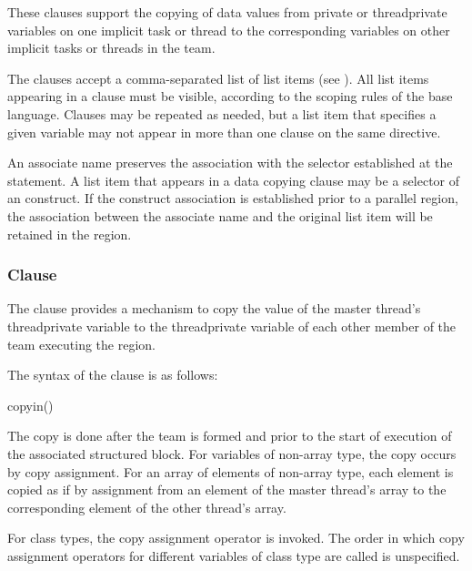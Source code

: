 {{{{These clauses support the copying of data values from private or threadprivate variables 
on one implicit task or thread to the corresponding variables on other implicit tasks or 
threads in the team.

The clauses accept a comma-separated list of list items (see ). 
All list items appearing in a clause must be visible, according to the scoping rules of the 
base language. Clauses may be repeated as needed, but a list item that specifies a given 
variable may not appear in more than one clause on the same directive.

\fortranspecificstart
An associate name preserves the association with the selector established at the  statement. A list item that appears in a data copying clause may be a selector of an  construct. If the construct association is established prior to a parallel region, the association between the associate name and the original list item will be retained in the region.
\fortranspecificend







\subsubsection{ Clause}
\label{subsubsec:copyin clause}
\summary
The  clause provides a mechanism to copy the value of the master thread’s 
threadprivate variable to the threadprivate variable of each other member of the team 
executing the  region. 

\syntax
The syntax of the  clause is as follows:

\begin{boxedcode}
copyin()
\end{boxedcode}

\descr
\ccppspecificstart
The copy is done after the team is formed and prior to the start of execution of the 
associated structured block. For variables of non-array type, the copy occurs by copy 
assignment. For an array of elements of non-array type, each element is copied as if by 
assignment from an element of the master thread’s array to the corresponding element of 
the other thread’s array. 
\ccppspecificend

\cppspecificstart
For class types, the copy assignment operator is invoked. The order in which copy 
assignment operators for different variables of class type are called is unspecified. 
\cppspecificend

}}}}
